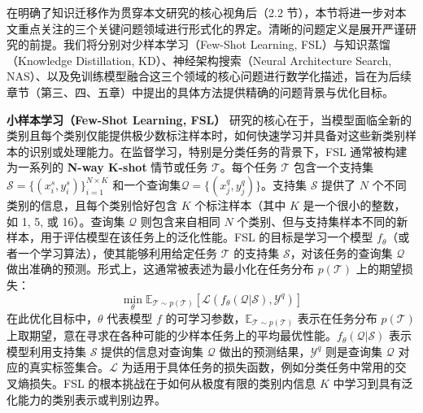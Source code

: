 \documentclass[../main.tex]{subfiles}
\begin{document}

在明确了知识迁移作为贯穿本文研究的核心视角后（2.2 节），本节将进一步对本文重点关注的三个关键问题领域进行形式化的界定。清晰的问题定义是展开严谨研究的前提。我们将分别对少样本学习（Few-Shot Learning, FSL）与知识蒸馏（Knowledge Distillation, KD）、神经架构搜索（Neural Architecture Search, NAS）、以及免训练模型融合这三个领域的核心问题进行数学化描述，旨在为后续章节（第三、四、五章）中提出的具体方法提供精确的问题背景与优化目标。


\textbf{小样本学习（Few-Shot Learning, FSL）} 研究的核心在于，当模型面临全新的类别且每个类别仅能提供极少数标注样本时，如何快速学习并具备对这些新类别样本的识别或处理能力。在监督学习，特别是分类任务的背景下，FSL 通常被构建为一系列的 \textbf{N-way K-shot} 情节或任务 $\mathcal{T}$。每个任务 $\mathcal{T}$ 包含一个支持集$\mathcal{S} = \{(x_i^s, y_i^s)\}_{i=1}^{N \times K}$ 和一个查询集$\mathcal{Q} = \{(x_j^q, y_j^q)\}$。支持集 $\mathcal{S}$ 提供了 $N$ 个不同类别的信息，且每个类别恰好包含 $K$ 个标注样本（其中 $K$ 是一个很小的整数，如 1, 5, 或 16）。查询集 $\mathcal{Q}$ 则包含来自相同 $N$ 个类别、但与支持集样本不同的新样本，用于评估模型在该任务上的泛化性能。FSL 的目标是学习一个模型 $f_\theta$（或者一个学习算法），使其能够利用给定任务 $\mathcal{T}$ 的支持集 $\mathcal{S}$，对该任务的查询集 $\mathcal{Q}$ 做出准确的预测。形式上，这通常被表述为最小化在任务分布 $p(\mathcal{T})$ 上的期望损失：
\begin{equation}
	\min_\theta \mathbb{E}_{\mathcal{T} \sim p(\mathcal{T})} \left[ \mathcal{L}\left(f_\theta(\mathcal{Q}|\mathcal{S}), \mathcal{Y}^q\right) \right]
	\label{eq:fsl_objective}
\end{equation}
在此优化目标中，$\theta$ 代表模型 $f$ 的可学习参数，$\mathbb{E}_{\mathcal{T} \sim p(\mathcal{T})}$ 表示在任务分布 $p(\mathcal{T})$ 上取期望，意在寻求在各种可能的少样本任务上的平均最优性能。$f_\theta(\mathcal{Q}|\mathcal{S})$ 表示模型利用支持集 $\mathcal{S}$ 提供的信息对查询集 $\mathcal{Q}$ 做出的预测结果，$\mathcal{Y}^q$ 则是查询集 $\mathcal{Q}$ 对应的真实标签集合。$\mathcal{L}$ 为适用于具体任务的损失函数，例如分类任务中常用的交叉熵损失。FSL 的根本挑战在于如何从极度有限的类别内信息 $K$ 中学习到具有泛化能力的类别表示或判别边界。
\end{document}
